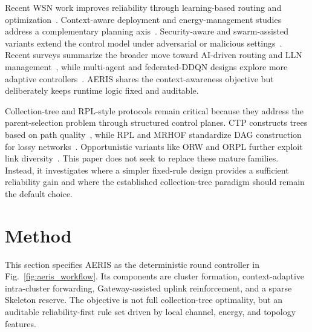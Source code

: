 \documentclass[conference]{IEEEtran}
\begin{document}
Recent WSN work improves reliability through learning-based routing and optimization~\cite{kumar2019machine,pushpa2025optimizing,ren2023mefi}. Context-aware deployment and energy-management studies address a complementary planning axis~\cite{tossa2025wireless,wang2024energy,khedr2025advancing}. Security-aware and swarm-assisted variants extend the control model under adversarial or malicious settings~\cite{hu2024security,almutairi2025secured}. Recent surveys summarize the broader move toward AI-driven routing and LLN management~\cite{almutairi2024survey,djennadi2025exploring,thakur2025ai}, while multi-agent and federated-DDQN designs explore more adaptive controllers~\cite{okine2024multi,singh2025enhanced,bhukya2025hybrid}. AERIS shares the context-awareness objective but deliberately keeps runtime logic fixed and auditable.

Collection-tree and RPL-style protocols remain critical because they address the parent-selection problem through structured control planes. CTP constructs trees based on path quality~\cite{gnawali2009collection}, while RPL and MRHOF standardize DAG construction for lossy networks~\cite{tsvetkov2011rpl,gnawali2012minimum}. Opportunistic variants like ORW and ORPL further exploit link diversity~\cite{landsiedel2012low,duquennoy2013let}. This paper does not seek to replace these mature families. Instead, it investigates where a simpler fixed-rule design provides a sufficient reliability gain and where the established collection-tree paradigm should remain the default choice.

\section{Method}
This section specifies AERIS as the deterministic round controller in Fig.~\ref{fig:aeris_workflow}. Its components are cluster formation, context-adaptive intra-cluster forwarding, Gateway-assisted uplink reinforcement, and a sparse Skeleton reserve. The objective is not full collection-tree optimality, but an auditable reliability-first rule set driven by local channel, energy, and topology features.
\end{document}
